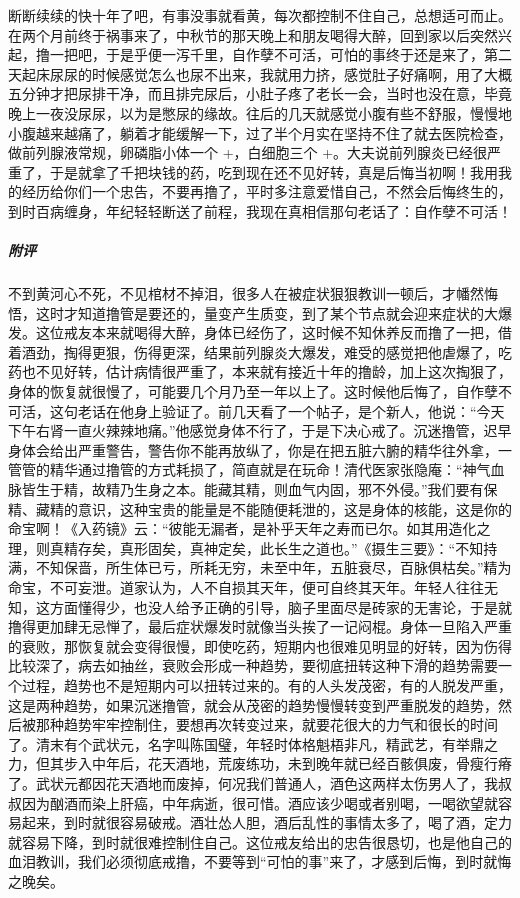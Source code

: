 \begin{case}
    断断续续的快十年了吧，有事没事就看黄，每次都控制不住自己，总想适可而止。在两个月前终于祸事来了，中秋节的那天晚上和朋友喝得大醉，回到家以后突然兴起，撸一把吧，于是乎便一泻千里，自作孽不可活，可怕的事终于还是来了，第二天起床尿尿的时候感觉怎么也尿不出来，我就用力挤，感觉肚子好痛啊，用了大概五分钟才把尿排干净，而且排完尿后，小肚子疼了老长一会，当时也没在意，毕竟晚上一夜没尿尿，以为是憋尿的缘故。往后的几天就感觉小腹有些不舒服，慢慢地小腹越来越痛了，躺着才能缓解一下，过了半个月实在坚持不住了就去医院检查，做前列腺液常规，卵磷脂小体一个 +，白细胞三个 +。大夫说前列腺炎已经很严重了，于是就拿了千把块钱的药，吃到现在还不见好转，真是后悔当初啊！我用我的经历给你们一个忠告，不要再撸了，平时多注意爱惜自己，不然会后悔终生的，到时百病缠身，年纪轻轻断送了前程，我现在真相信那句老话了：自作孽不可活！
    \subparagraph{附评} 不到黄河心不死，不见棺材不掉泪，很多人在被症状狠狠教训一顿后，才幡然悔悟，这时才知道撸管是要还的，量变产生质变，到了某个节点就会迎来症状的大爆发。这位戒友本来就喝得大醉，身体已经伤了，这时候不知休养反而撸了一把，借着酒劲，掏得更狠，伤得更深，结果前列腺炎大爆发，难受的感觉把他虐爆了，吃药也不见好转，估计病情很严重了，本来就有接近十年的撸龄，加上这次掏狠了，身体的恢复就很慢了，可能要几个月乃至一年以上了。这时候他后悔了，自作孽不可活，这句老话在他身上验证了。前几天看了一个帖子，是个新人，他说：“今天下午右肾一直火辣辣地痛。”他感觉身体不行了，于是下决心戒了。沉迷撸管，迟早身体会给出严重警告，警告你不能再放纵了，你是在把五脏六腑的精华往外拿，一管管的精华通过撸管的方式耗损了，简直就是在玩命！清代医家张隐庵：“神气血脉皆生于精，故精乃生身之本。能藏其精，则血气内固，邪不外侵。”我们要有保精、藏精的意识，这种宝贵的能量是不能随便耗泄的，这是身体的核能，这是你的命宝啊！《入药镜》云：“彼能无漏者，是补乎天年之寿而已尔。如其用造化之理，则真精存矣，真形固矣，真神定矣，此长生之道也。”《摄生三要》：“不知持满，不知保啬，所生体已亏，所耗无穷，未至中年，五脏衰尽，百脉俱枯矣。”精为命宝，不可妄泄。道家认为，人不自损其天年，便可自终其天年。年轻人往往无知，这方面懂得少，也没人给予正确的引导，脑子里面尽是砖家的无害论，于是就撸得更加肆无忌惮了，最后症状爆发时就像当头挨了一记闷棍。身体一旦陷入严重的衰败，那恢复就会变得很慢，即使吃药，短期内也很难见明显的好转，因为伤得比较深了，病去如抽丝，衰败会形成一种趋势，要彻底扭转这种下滑的趋势需要一个过程，趋势也不是短期内可以扭转过来的。有的人头发茂密，有的人脱发严重，这是两种趋势，如果沉迷撸管，就会从茂密的趋势慢慢转变到严重脱发的趋势，然后被那种趋势牢牢控制住，要想再次转变过来，就要花很大的力气和很长的时间了。清末有个武状元，名字叫陈国璧，年轻时体格魁梧非凡，精武艺，有举鼎之力，但其步入中年后，花天酒地，荒废练功，未到晚年就已经百骸俱废，骨瘦行瘠了。武状元都因花天酒地而废掉，何况我们普通人，酒色这两样太伤男人了，我叔叔因为酗酒而染上肝癌，中年病逝，很可惜。酒应该少喝或者别喝，一喝欲望就容易起来，到时就很容易破戒。酒壮怂人胆，酒后乱性的事情太多了，喝了酒，定力就容易下降，到时就很难控制住自己。这位戒友给出的忠告很恳切，也是他自己的血泪教训，我们必须彻底戒撸，不要等到“可怕的事”来了，才感到后悔，到时就悔之晚矣。
\end{case}

